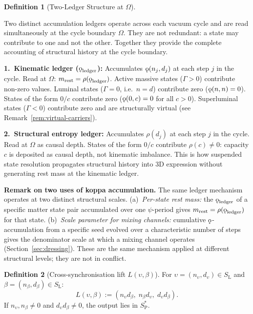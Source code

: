 \documentclass[11pt, letterpaper]{article}
\newcommand{\SL}{S_{\mathrm{L}}}
\newcommand{\SPs}{S_{\mathrm{P}}^{*}}
\newcommand{\rank}{\rho}
\newcommand{\koppa}{\mathbin{\text{\rm\k{o}}}}
\newcommand{\Tcharge}{\Gamma}
\theoremstyle{definition}
\newtheorem{definition}{Definition}[section]
\theoremstyle{plain}
\begin{document}
\begin{definition}[Two-Ledger Structure at $\Omega$]\label{def:two-ledgers}
\begin{rsbox}
Two distinct accumulation ledgers operate across each vacuum cycle and are
read simultaneously at the cycle boundary $\Omega$.  They are not redundant:
a state may contribute to one and not the other.  Together they provide the
complete accounting of structural history at the cycle boundary.

\medskip
\noindent\textbf{1.\ Kinematic ledger ($\koppa_{\mathrm{ledger}}$):}
Accumulates $\koppa(n_j, d_j)$ at each step $j$ in the cycle.  Read at
$\Omega$: $m_{\mathrm{rest}} = \rank(\koppa_{\mathrm{ledger}})$.  Active
massive states ($\Tcharge > 0$) contribute non-zero values.  Luminal states
($\Tcharge = 0$, i.e.\ $n=d$) contribute zero ($\koppa(n,n)=0$).  States
of the form $0/c$ contribute zero ($\koppa(0,c)=0$ for all $c>0$).
Superluminal states ($\Tcharge<0$) contribute zero and are structurally
virtual (see Remark~\ref{rem:virtual-carriers}).

\medskip
\noindent\textbf{2.\ Structural entropy ledger:}
Accumulates $\rank(d_j)$ at each step $j$ in the cycle.  Read at $\Omega$
as causal depth.  States of the form $0/c$ contribute $\rank(c)\neq 0$:
capacity $c$ is deposited as causal depth, not kinematic imbalance.  This
is how suspended state resolution propagates structural history into 3D
expression without generating rest mass at the kinematic ledger.

\medskip
\noindent\textbf{Remark on two uses of koppa accumulation.}
The same ledger mechanism operates at two distinct structural scales.
(a)~\emph{Per-state rest mass:} the $\koppa_{\mathrm{ledger}}$ of a specific
matter state pair accumulated over one $\psi$-period gives
$m_{\mathrm{rest}} = \rank(\koppa_{\mathrm{ledger}})$ for that state.
(b)~\emph{Scale parameter for mixing channels:} cumulative
$\koppa$-accumulation from a specific seed evolved over a characteristic
number of steps gives the denominator scale at which a mixing channel
operates (Section~\ref{sec:dressing}).  These are the same mechanism
applied at different structural levels; they are not in conflict.
\end{rsbox}
\end{definition}

\begin{definition}[Cross-synchronisation lift $L(\upsilon,\beta)$]
\label{def:cross-sync}
For $\upsilon=(n_\upsilon,d_\upsilon)\in\SL$ and
$\beta=(n_\beta,d_\beta)\in\SL$:
\[
L(\upsilon,\beta):=(n_\upsilon d_\beta,\;n_\beta d_\upsilon,\;d_\upsilon d_\beta).
\]
If $n_\upsilon,n_\beta\neq 0$ and $d_\upsilon d_\beta\neq 0$, the output lies
in $\SPs$.
\end{definition}
\end{document}
